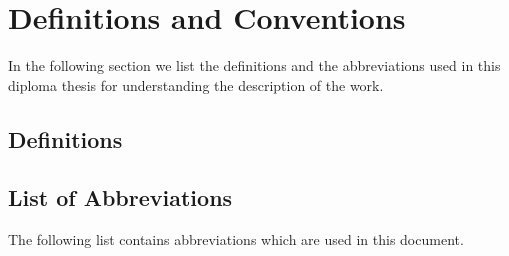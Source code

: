 \section{Definitions and Conventions}
\label{sec:definitions}

In the following section we list the definitions and the abbreviations used in this diploma thesis for understanding the description of the work.

\subsection*{Definitions}

\subsection*{List of Abbreviations}

The following list contains abbreviations which are used in this document. 

